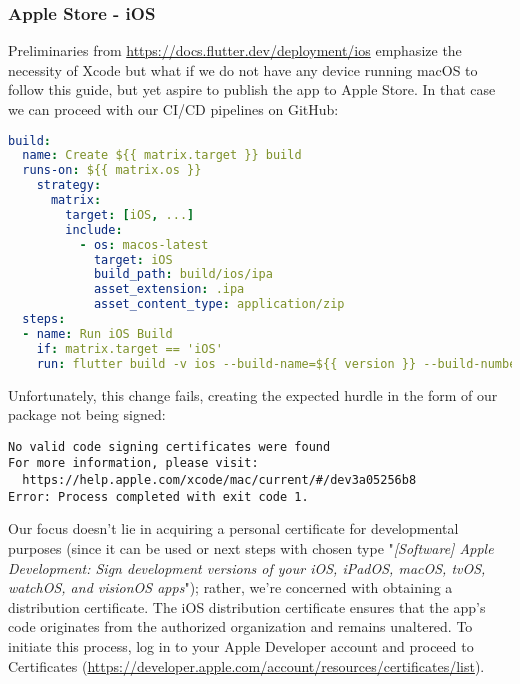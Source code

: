 
\subsubsection{Apple Store - iOS} \label{d-ios}

Preliminaries from \href{https://docs.flutter.dev/deployment/ios}{https://docs.flutter.dev/deployment/ios} emphasize 
the necessity of Xcode but what if we do not have any device running macOS to follow this guide, but yet aspire to 
publish the app to Apple Store. In that case we can proceed with our CI/CD pipelines on GitHub:

\begin{lstlisting}[language=yaml]
build:
  name: Create ${{ matrix.target }} build
  runs-on: ${{ matrix.os }}
    strategy:
      matrix:
        target: [iOS, ...]
        include:
          - os: macos-latest
            target: iOS
            build_path: build/ios/ipa
            asset_extension: .ipa
            asset_content_type: application/zip
  steps:
  - name: Run iOS Build
    if: matrix.target == 'iOS'
    run: flutter build -v ios --build-name=${{ version }} --build-number=${{ number }} --release --no-tree-shake-icons
\end{lstlisting}

\noindent Unfortunately, this change fails, creating the expected hurdle in the form of our package not being signed:

\begin{lstlisting}[language=terminal]
No valid code signing certificates were found
For more information, please visit:
  https://help.apple.com/xcode/mac/current/#/dev3a05256b8
Error: Process completed with exit code 1.
\end{lstlisting}

\noindent Our focus doesn't lie in acquiring a personal certificate for developmental purposes (since it can be used 
 or next steps with chosen type "\emph{[Software] Apple Development: Sign 
development versions of your iOS, iPadOS, macOS, tvOS, watchOS, and visionOS apps}"); rather, we're concerned with 
obtaining a distribution certificate. The iOS distribution certificate ensures that the app's code originates from the 
authorized organization and remains unaltered. To initiate this process, log in to your Apple Developer account and 
proceed to Certificates
(\href{https://developer.apple.com/account/resources/certificates/list}{https://developer.apple.com/account/resources/certificates/list}).


